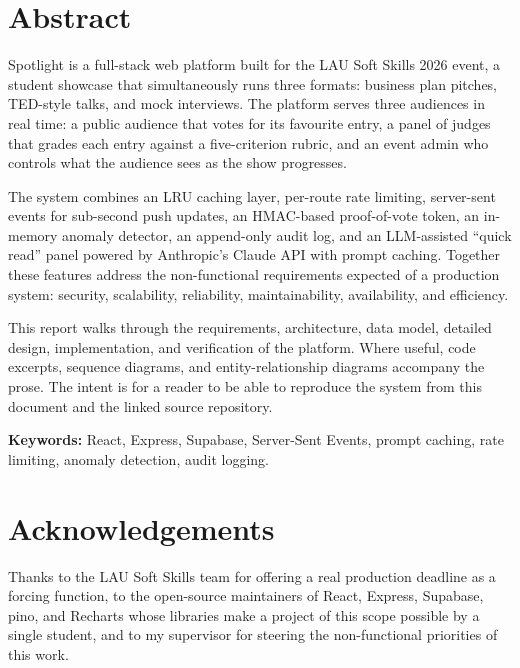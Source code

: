 \section*{Abstract}

Spotlight is a full-stack web platform built for the LAU Soft Skills 2026 event,
a student showcase that simultaneously runs three formats: business plan
pitches, TED-style talks, and mock interviews. The platform serves three
audiences in real time: a public audience that votes for its favourite entry,
a panel of judges that grades each entry against a five-criterion rubric, and
an event admin who controls what the audience sees as the show progresses.

The system combines an LRU caching layer, per-route rate limiting, server-sent
events for sub-second push updates, an HMAC-based proof-of-vote token, an
in-memory anomaly detector, an append-only audit log, and an LLM-assisted
``quick read'' panel powered by Anthropic's Claude API with prompt caching.
Together these features address the non-functional requirements expected of a
production system: security, scalability, reliability, maintainability,
availability, and efficiency.

This report walks through the requirements, architecture, data model, detailed
design, implementation, and verification of the platform. Where useful, code
excerpts, sequence diagrams, and entity-relationship diagrams accompany the
prose. The intent is for a reader to be able to reproduce the system from this
document and the linked source repository.

\vspace{1em}
\noindent\textbf{Keywords:} React, Express, Supabase, Server-Sent Events,
prompt caching, rate limiting, anomaly detection, audit logging.

\section*{Acknowledgements}

Thanks to the LAU Soft Skills team for offering a real production deadline as
a forcing function, to the open-source maintainers of React, Express,
Supabase, pino, and Recharts whose libraries make a project of this scope
possible by a single student, and to my supervisor for steering the
non-functional priorities of this work.
